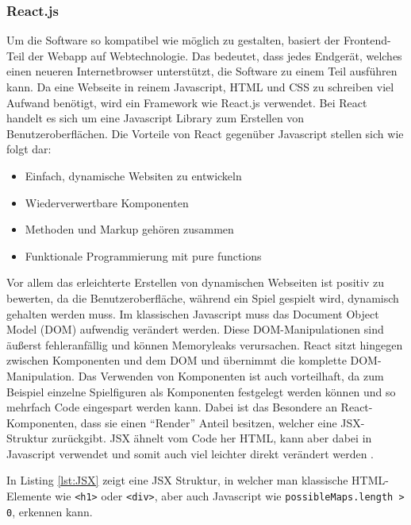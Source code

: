 \documentclass[12pt,a4paper,bibliography=totocnumbered,listof=totocnumbered]{article}
\begin{document}
\subsubsection{React.js}
Um die Software so kompatibel wie möglich zu gestalten, basiert der Frontend-Teil der Webapp auf Webtechnologie. Das bedeutet, dass jedes Endgerät, welches einen neueren 
Internetbrowser unterstützt, die Software zu einem Teil ausführen kann. Da eine Webseite in reinem Javascript, HTML und CSS zu schreiben viel Aufwand benötigt, 
wird ein Framework wie React.js verwendet. Bei React handelt es sich um eine Javascript Library zum Erstellen von Benutzeroberflächen.
Die Vorteile von React gegenüber Javascript stellen sich wie folgt dar:
\begin{itemize}
    \item Einfach, dynamische Websiten zu entwickeln
    \item Wiederverwertbare Komponenten
    \item Methoden und Markup gehören zusammen
    \item Funktionale Programmierung mit pure functions
\end{itemize}
Vor allem das erleichterte Erstellen von dynamischen Webseiten ist positiv zu bewerten, da die Benutzeroberfläche, während ein Spiel gespielt wird, dynamisch gehalten werden muss.
Im klassischen Javascript muss das Document Object Model (DOM) aufwendig verändert werden. Diese DOM-Manipulationen sind äußerst fehleranfällig und können Memoryleaks
verursachen. React sitzt hingegen zwischen Komponenten und dem DOM und übernimmt die komplette DOM-Manipulation.
Das Verwenden von Komponenten ist auch vorteilhaft, da zum Beispiel einzelne Spielfiguren als Komponenten festgelegt werden können 
und so mehrfach Code eingespart werden kann. 
Dabei ist das Besondere an React-Komponenten, dass sie einen ``Render'' Anteil besitzen, welcher eine JSX-Struktur zurückgibt. 
JSX ähnelt vom Code her HTML, kann aber dabei in Javascript verwendet und somit auch viel leichter direkt verändert werden \cite{React.js}.

\vspace{1em}


In Listing \ref{lst:JSX} zeigt eine JSX Struktur, in welcher man klassische HTML-Elemente wie \texttt{<h1>} oder \texttt{<div>}, aber auch Javascript wie 
\texttt{possibleMaps.length > 0}, erkennen kann.
\end{document}
